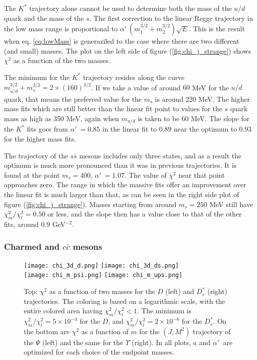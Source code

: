 \documentclass[11pt,a4]{article}
\newcommand{\alp}{\ensuremath{\alpha'\:}}
\newcommand{\ssb}{s\bar{s}}
\newcommand{\ccb}{c\bar{c}}
\newcommand{\rchi}[1]{\ensuremath{\chi^2_m/\chi^2_l = #1}}
\newcommand{\ten}[1]{\times10^{#1}}
\newcommand{\mud}{m_{u/d}}
\begin{document}
			The \(K^*\) trajectory alone cannot be used to determine both the mass of the \(u/d\) quark and the mass of the \(s\). The first correction to the linear Regge trajectory in the low mass range is proportional to \(\alp\left(m_1^{3/2}+m_2^{3/2}\right)\sqrt{E}\). This is the result when eq. \eqref{eq:lowMass} is generaziled to the case where there are two different (and small) masses. The plot on the left side of figure (\ref{fig:chi_j_strange}) shows \(\chi^2\) as a function of the two masses.
			
			The minimum for the \(K^*\) trajectory resides along the curve \(\mud^{3/2} + m_s^{3/2} = 2\times(160)^{3/2}\). If we take a value of around \(60\) MeV for the \(u/d\) quark, that means the preferred value for the \(m_s\) is around 220 MeV. The higher mass fits which are still better than the linear fit point to values for the \(s\) quark mass as high as 350 MeV, again when \(\mud\) is taken to be 60 MeV. The slope for the \(K^*\) fits goes from \(\alp = 0.85\) in the linear fit to \(0.89\) near the optimum to \(0.93\) for the higher mass fits.
			
			The trajectory of the \(\ssb\) mesons includes only three states, and as a result the optimum is much more pronounced than it was in previous trajectories. It is found at the point \(m_s = 400\), \(\alp = 1.07\). The value of \(\chi^2\) near that point approaches zero. The range in which the massive fits offer an improvement over the linear fit is much larger than that, as can be seen in the right side plot of figure (\ref{fig:chi_j_strange}). Masses starting from around \(m_s = 250\) MeV still have \rchi{0.50} or less, and the slope then has a value close to that of the other fits, around \(0.9\) GeV\(^{-2}\).
		
		\subsubsection{Charmed and \texorpdfstring{$\ccb$}{c-cbar} mesons}
		
		\begin{figure}[t!] \centering
						\texttt{[image: chi\_3d\_d.png]}	 \hfill
						\texttt{[image: chi\_3d\_ds.png]} \\	
						\texttt{[image: chi\_m\_psi.png]} \hfill
						\texttt{[image: chi\_m\_ups.png]}
						\caption{\label{fig:chi_j_heavy} Top: \(\chi^2\) as a function of two masses for the \(D\) (left) and \(D^*_s\) (right) trajectories. The coloring is based on a logarithmic scale, with the entire colored area having \(\chi^2_m/\chi^2_l < 1\). The minimum is \rchi{5\ten{-4}} for the \(D\), and \rchi{2\ten{-6}} for the \(D^*_s\). On the bottom are \(\chi^2\) as a function of \(m\) for the \((J,M^2)\) trajectory of the \(\Psi\) (left) and the same for the \(\Upsilon\) (right). In all plots, \(a\) and \(\alp\) are optimized for each choice of the endpoint masses.}
				\end{figure}
				
\end{document}
